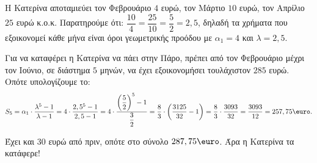 \begin{alist}
\item Η Κατερίνα αποταμιεύει τον Φεβρουάριο $4$ ευρώ, τον Μάρτιο $10$ ευρώ, τον Απρίλιο $25$ ευρώ κ.ο.κ. Παρατηρούμε ότι: $\dfrac{10}{4} = \dfrac{25}{10} = \dfrac{5}{2} = 2,5$, δηλαδή τα χρήματα που εξοικονομεί κάθε μήνα είναι όροι γεωμετρικής προόδου με $\alpha_1 = 4$ και $\lambda = 2,5$.

Για να καταφέρει η Κατερίνα να πάει στην Πάρο, πρέπει από τον Φεβρουάριο μέχρι τον Ιούνιο, σε διάστημα $5$ μηνών, να έχει εξοικονομήσει τουλάχιστον $285$ ευρώ. Οπότε υπολογίζουμε το:
\[S_5 = \alpha_1 \cdot \dfrac{\lambda^5 - 1}{\lambda - 1} = 4 \cdot \dfrac{2,5^5 - 1}{2,5 - 1} = 4 \cdot \dfrac{\left(\dfrac{5}{2}\right)^5 - 1}{\dfrac{3}{2}} = \dfrac{8}{3} \cdot \left(\dfrac{3125}{32} - 1\right) = \dfrac{8}{3} \cdot \dfrac{3093}{32} = \dfrac{3093}{12} = 257,75\text{\euro}.\]

Έχει και $30$ ευρώ από πριν, οπότε στο σύνολο $287,75\text{\euro}$. Άρα η Κατερίνα τα κατάφερε!
\end{alist}

